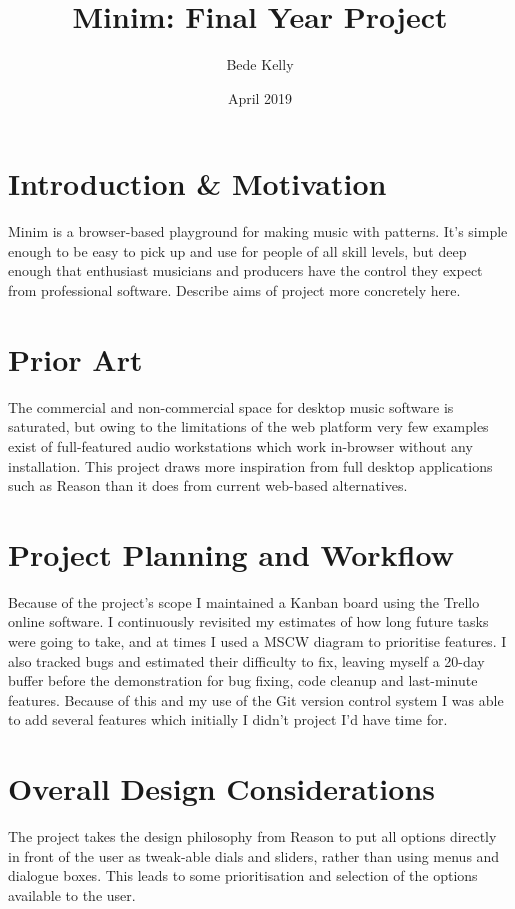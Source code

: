 \documentclass[11pt, a4paper]{article}
\begin{document}
\title{Minim: Final Year Project}
\author{Bede Kelly}
\date{April 2019}

\maketitle

\tableofcontents
\pagebreak


\section{Introduction \& Motivation}
Minim is a browser-based playground for making music with patterns. It's simple enough to be easy to pick up and use for people of all skill levels, but deep enough that enthusiast musicians and producers have the control they expect from professional software. Describe aims of project more concretely here.
\pagebreak

\section{Prior Art}
The commercial and non-commercial space for desktop music software is saturated, but owing to the limitations of the web platform very few examples exist of full-featured audio workstations which work in-browser without any installation. This project draws more inspiration from full desktop applications such as Reason than it does from current web-based alternatives.
\pagebreak

\section{Project Planning and Workflow}
Because of the project's scope I maintained a Kanban board using the Trello online software. I continuously revisited my estimates of how long future tasks were going to take, and at times I used a MSCW diagram to prioritise features. I also tracked bugs and estimated their difficulty to fix, leaving myself a 20-day buffer before the demonstration for bug fixing, code cleanup and last-minute features. Because of this and my use of the Git version control system I was able to add several features which initially I didn't project I'd have time for.
\pagebreak

\section{Overall Design Considerations}
The project takes the design philosophy from Reason to put all options directly in front of the user as tweak-able dials and sliders, rather than using menus and dialogue boxes. This leads to some prioritisation and selection of the options available to the user. 
\pagebreak
\end{document}
